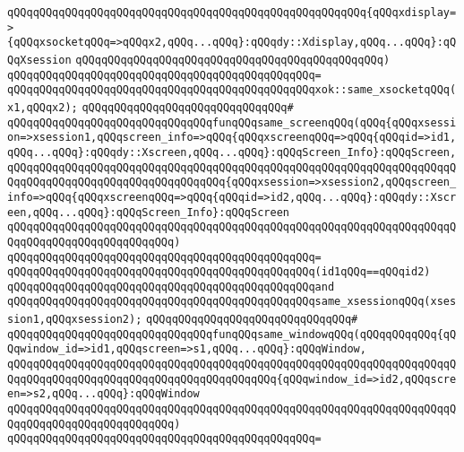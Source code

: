 \verb|qQQqqQQqqQQqqQQqqQQqqQQqqQQqqQQqqQQqqQQqqQQqqQQqqQQqqQQq{qQQqxdisplay=>{qQQqxsocketqQQq=>qQQqx2,qQQq...qQQq}:qQQqdy::Xdisplay,qQQq...qQQq}:qQQqXsession|\newline
\verb|qQQqqQQqqQQqqQQqqQQqqQQqqQQqqQQqqQQqqQQqqQQqqQQq)|\newline
\verb|qQQqqQQqqQQqqQQqqQQqqQQqqQQqqQQqqQQqqQQqqQQqqQQq=|\newline
\verb|qQQqqQQqqQQqqQQqqQQqqQQqqQQqqQQqqQQqqQQqqQQqqQQqxok::same_xsocketqQQq(x1,qQQqx2);|\newline
\verb|qQQqqQQqqQQqqQQqqQQqqQQqqQQqqQQq#|\newline
\verb|qQQqqQQqqQQqqQQqqQQqqQQqqQQqqQQqfunqQQqsame_screenqQQq(qQQq{qQQqxsession=>xsession1,qQQqscreen_info=>qQQq{qQQqxscreenqQQq=>qQQq{qQQqid=>id1,qQQq...qQQq}:qQQqdy::Xscreen,qQQq...qQQq}:qQQqScreen_Info}:qQQqScreen,|\newline
\verb|qQQqqQQqqQQqqQQqqQQqqQQqqQQqqQQqqQQqqQQqqQQqqQQqqQQqqQQqqQQqqQQqqQQqqQQqqQQqqQQqqQQqqQQqqQQqqQQqqQQqqQQq{qQQqxsession=>xsession2,qQQqscreen_info=>qQQq{qQQqxscreenqQQq=>qQQq{qQQqid=>id2,qQQq...qQQq}:qQQqdy::Xscreen,qQQq...qQQq}:qQQqScreen_Info}:qQQqScreen|\newline
\verb|qQQqqQQqqQQqqQQqqQQqqQQqqQQqqQQqqQQqqQQqqQQqqQQqqQQqqQQqqQQqqQQqqQQqqQQqqQQqqQQqqQQqqQQqqQQqqQQq)|\newline
\verb|qQQqqQQqqQQqqQQqqQQqqQQqqQQqqQQqqQQqqQQqqQQqqQQq=|\newline
\verb|qQQqqQQqqQQqqQQqqQQqqQQqqQQqqQQqqQQqqQQqqQQqqQQq(id1qQQq==qQQqid2)|\newline
\verb|qQQqqQQqqQQqqQQqqQQqqQQqqQQqqQQqqQQqqQQqqQQqqQQqand|\newline
\verb|qQQqqQQqqQQqqQQqqQQqqQQqqQQqqQQqqQQqqQQqqQQqqQQqsame_xsessionqQQq(xsession1,qQQqxsession2);|\newline
\verb|qQQqqQQqqQQqqQQqqQQqqQQqqQQqqQQq#|\newline
\verb|qQQqqQQqqQQqqQQqqQQqqQQqqQQqqQQqfunqQQqsame_windowqQQq(qQQqqQQqqQQq{qQQqwindow_id=>id1,qQQqscreen=>s1,qQQq...qQQq}:qQQqWindow,|\newline
\verb|qQQqqQQqqQQqqQQqqQQqqQQqqQQqqQQqqQQqqQQqqQQqqQQqqQQqqQQqqQQqqQQqqQQqqQQqqQQqqQQqqQQqqQQqqQQqqQQqqQQqqQQqqQQqqQQq{qQQqwindow_id=>id2,qQQqscreen=>s2,qQQq...qQQq}:qQQqWindow|\newline
\verb|qQQqqQQqqQQqqQQqqQQqqQQqqQQqqQQqqQQqqQQqqQQqqQQqqQQqqQQqqQQqqQQqqQQqqQQqqQQqqQQqqQQqqQQqqQQqqQQq)|\newline
\verb|qQQqqQQqqQQqqQQqqQQqqQQqqQQqqQQqqQQqqQQqqQQqqQQq=|\newline
